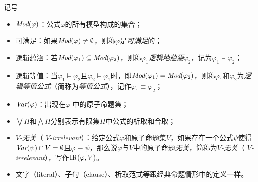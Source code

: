 \documentclass[9pt, CJK]{beamer}
\begin{document}
\begin{frame}
{{\begin{block}{记号}
		\begin{itemize}
			\item $\textit{Mod}(\varphi)$：公式$\varphi$的所有模型构成的集合；
			\item 可满足：如果$\textit{Mod}(\varphi)\not = \emptyset$，则称$\varphi$是\emph{可满足}的；
			\item 逻辑蕴涵：若$\textit{Mod}(\varphi_1)\subseteq \textit{Mod}(\varphi_2)$，则称$\varphi_1$\emph{逻辑地蕴涵}$\varphi_2$，记为$\varphi_1\models \varphi_2$；
			\item 逻辑等值：当$\varphi_1\models \varphi_2$且$\varphi_2\models \varphi_1$时，即$\textit{Mod}(\varphi_1)= \textit{Mod}(\varphi_2)$，则称$\varphi_1$和$\varphi_2$为\emph{逻辑等值公式}（简称为\emph{等值公式}），记作$\varphi_1 \equiv \varphi_2$；
			\item $\textit{Var}(\varphi)$：出现在$\varphi$ 中的原子命题集；
			\item $\bigvee \Pi$和$\bigwedge \Pi$分别表示有限集$\Pi$中公式的析取和合取；
			\item \emph{$V$-无关}（ \emph{$V$-irrelevant}）：给定公式$\varphi$和原子命题集$V$，如果存在一个公式$\psi$使得$\textit{Var}(\psi) \cap V = \emptyset$且$\varphi \equiv \psi$，那么说$\varphi$与$V$中的原子命题\emph{无关}，简称为\emph{$V$-无关}（ \emph{$V$-irrelevant}），写作$\textrm{IR}(\varphi,V)$。
			\item 文字（literal）、子句（clause）、析取范式等跟经典命题情形中的定义一样。
		\end{itemize}
	\end{block}
}
	}
\end{frame}
\end{document}

